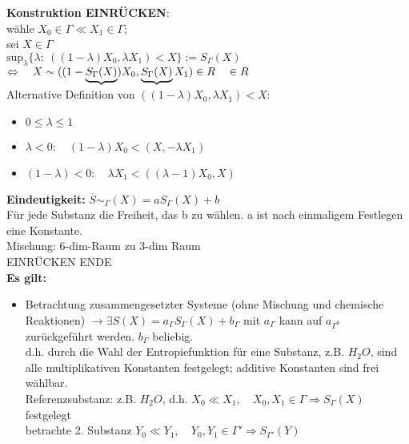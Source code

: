 \documentclass[10pt,article,colorback,accentcolor=tud9d]{tudreport}
\begin{document}
\textbf{Konstruktion EINRÜCKEN}:\\
wähle $X_0 \in \Gamma \ll X_1 \in \Gamma$;\\
sei $X \in \Gamma$\\
$\text{sup}_\lambda \{\lambda: \ ((1-\lambda)X_0,\lambda X_1) < X\}:=S_\Gamma(X)$\\
$\Leftrightarrow \quad X \sim ((1-\underbrace{S_\Gamma(X)})X_0,\underbrace{S_\Gamma(X)}X_1)\\
\in R \quad \in R$\\
Alternative Definition von $((1-\lambda)X_0,\lambda X_1)<X$:\\
\begin{itemize}
\item $0 \leq \lambda \leq 1$
\item $\lambda < 0: \quad (1-\lambda)X_0<(X,-\lambda X_1)$
\item $(1-\lambda)<0: \quad \lambda X_1<((\lambda-1)X_0,X)$
\end{itemize} 
\textbf{Eindeutigkeit:} $\overline{S}\sim_\Gamma(X)=aS_\Gamma(X)+b$\\
Für jede Substanz die Freiheit, das b zu wählen. a ist nach einmaligem Festlegen eine Konstante.\\
Mischung: 6-dim-Raum zu 3-dim Raum\\
EINRÜCKEN ENDE\\
\textbf{Es gilt:}
\begin{itemize}
\item Betrachtung zusammengesetzter Systeme (ohne Mischung und chemische Reaktionen)
$\rightarrow \exists S(X) = a_\Gamma S_\Gamma(X) + b_\Gamma$ mit $a_\Gamma$ kann auf $a_{\Gamma^0}$ zurückgeführt werden. $b_\Gamma$ beliebig.\\
d.h. durch die Wahl der Entropiefunktion für eine Substanz, z.B. $H_2O$, sind alle multiplikativen Konstanten festgelegt; additive Konstanten sind frei wählbar.\\
Referenzsubstanz: z.B. $H_2O$, d.h. $X_0 \ll X_1, \quad X_0,X_1 \in \Gamma \Rightarrow S_\Gamma(X)$ festgelegt\\
betrachte 2. Substanz $Y_0 \ll Y_1, \quad Y_0,Y_1 \in \Gamma' \Rightarrow S_{\Gamma'}(Y)$\\
\end{itemize}
\end{document}
